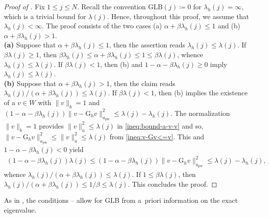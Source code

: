 \documentclass[a4paper]{amsart}
\numberwithin{equation}{section}
\newcommand{\pw}{\mathrm{pw}}
\theoremstyle{remark}
\theoremstyle{definition}
\theoremstyle{assumptionnoperiod}
\begin{document}
\begin{proof}[Proof of ]
	Fix $1 \leq j \leq N$.
	Recall the convention $\mathrm{GLB}(j) \coloneqq 0$ for $\lambda_h(j) = \infty$, which is a trivial bound for $\lambda(j)$. Hence, throughout this proof, we assume that $\lambda_h(j) < \infty$.
	The proof 
	consists of the two cases (a) $\alpha + \beta \lambda_h(j) \leq 1$ and (b) $\alpha + \beta \lambda_h(j) > 1$.\\[-0.5em]
	
	\noindent\textbf{(a)} Suppose that $\alpha + \beta \lambda_h(j) \leq 1$, then the assertion reads
	$\lambda_h(j) \leq \lambda(j)$.
	If $\beta \lambda(j) \geq 1$, then $\beta \lambda_h(j) \leq \alpha + \beta \lambda_h(j) \leq 1 \leq \beta \lambda(j)$, whence $\lambda_h(j) \leq \lambda(j)$.
	If $\beta \lambda(j) < 1$, then (b) and $1 - \alpha - \beta \lambda_h(j) \geq 0$ imply $\lambda_h(j) \leq \lambda(j)$.\\[-0.5em]
	
	\noindent\textbf{(b)} Suppose that $\alpha + \beta \lambda_h(j) > 1$, then the claim reads $\lambda_h(j)/(\alpha + \beta \lambda_h(j)) \leq \lambda(j)$.
	If $\beta \lambda(j) < 1$, then (b) implies the existence of a $v \in W$ with $\|v\|_b = 1$ and $(1 - \alpha - \beta \lambda_h(j))\|v - \mathrm{G}_h v\|_{a_\pw}^2 \leq \lambda(j) - \lambda_h(j)$. The normalization $\|v\|_b = 1$ provides $\|v\|_a^2 \leq \lambda(j)$ in \eqref{ineq:bound-a-v-v} and so, $\|v - \mathrm{G}_h v\|_{a_\pw}^2 \leq \|v\|_a^2 \leq \lambda(j)$ from \eqref{ineq:v-Gv<=v}. This and $1 - \alpha - \beta \lambda_h(j) < 0$ yield
	\begin{align*}
		 (1 - \alpha - \beta \lambda_h(j)) \lambda(j) \leq (1 - \alpha - \beta \lambda_h(j))\|v - \mathrm{G}_h v\|_{a_\pw}^2 \leq \lambda(j) - \lambda_h(j),
	\end{align*}
	whence $\lambda_h(j)/(\alpha + \beta \lambda_h(j)) \leq \lambda(j)$. If $1 \leq \beta \lambda(j)$, then $\lambda_h(j)/(\alpha + \beta \lambda_h(j)) \leq 1/\beta \leq \lambda(j)$. This concludes the proof.
\end{proof}

As in \cite{CarstensenZhaiZhang2020,CarstensenErnPuttkammer2021,BertrandCarstensenGraessle2021}, the conditions -- allow for GLB from a~priori information on the exact eigenvalue.
\end{document}
